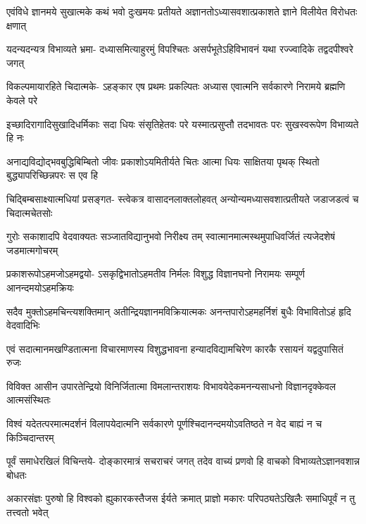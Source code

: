 \fourlineindentedshloka
{एवंविधे ज्ञानमये सुखात्मके}
{कथं भवो दुःखमयः प्रतीयते}
{अज्ञानतोऽध्यासवशात्प्रकाशते}
{ज्ञाने विलीयेत विरोधतः क्षणात्} %

\fourlineindentedshloka
{यदन्यदन्यत्र विभाव्यते भ्रमा-}
{दध्यासमित्याहुरमुं विपश्चितः}
{असर्पभूतेऽहिविभावनं यथा}
{रज्ज्वादिके तद्वदपीश्वरे जगत्} %

\fourlineindentedshloka
{विकल्पमायारहिते चिदात्मके-}
{ऽहङ्कार एष प्रथमः प्रकल्पितः}
{अध्यास एवात्मनि सर्वकारणे}
{निरामये ब्रह्मणि केवले परे} %

\fourlineindentedshloka
{इच्छादिरागादिसुखादिधर्मिकाः}
{सदा धियः संसृतिहेतवः परे}
{यस्मात्प्रसुप्तौ तदभावतः परः}
{सुखस्वरूपेण विभाव्यते हि नः} %

\fourlineindentedshloka
{अनाद्यविद्योद्भवबुद्धिबिम्बितो}
{जीवः प्रकाशोऽयमितीर्यते चितः}
{आत्मा धियः साक्षितया पृथक् स्थितो}
{बुद्ध्यापरिच्छिन्नपरः स एव हि} %

\fourlineindentedshloka
{चिद्बिम्बसाक्ष्यात्मधियां प्रसङ्गत-}
{स्त्वेकत्र वासादनलाक्तलोहवत्}
{अन्योन्यमध्यासवशात्प्रतीयते}
{जडाजडत्वं च चिदात्मचेतसोः} %

\fourlineindentedshloka
{गुरोः सकाशादपि वेदवाक्यतः}
{सञ्जातविद्यानुभवो निरीक्ष्य तम्}
{स्वात्मानमात्मस्थमुपाधिवर्जितं}
{त्यजेदशेषं जडमात्मगोचरम्} %

\fourlineindentedshloka
{प्रकाशरूपोऽहमजोऽहमद्वयो-}
{ऽसकृद्विभातोऽहमतीव निर्मलः}
{विशुद्ध विज्ञानघनो निरामयः}
{सम्पूर्ण आनन्दमयोऽहमक्रियः} %

\fourlineindentedshloka
{सदैव मुक्तोऽहमचिन्त्यशक्तिमान्}
{अतीन्द्रियज्ञानमविक्रियात्मकः}
{अनन्तपारोऽहमहर्निशं बुधैः}
{विभावितोऽहं हृदि वेदवादिभिः} %

\fourlineindentedshloka
{एवं सदात्मानमखण्डितात्मना}
{विचारमाणस्य विशुद्धभावना}
{हन्यादविद्यामचिरेण कारकै}
{रसायनं यद्वदुपासितं रुजः} %

\fourlineindentedshloka
{विविक्त आसीन उपारतेन्द्रियो}
{विनिर्जितात्मा विमलान्तराशयः}
{विभावयेदेकमनन्यसाधनो}
{विज्ञानदृक्केवल आत्मसंस्थितः} %

\fourlineindentedshloka
{विश्वं यदेतत्परमात्मदर्शनं}
{विलापयेदात्मनि सर्वकारणे}
{पूर्णश्चिदानन्दमयोऽवतिष्ठते}
{न वेद बाह्यं न च किञ्चिदान्तरम्} %

\fourlineindentedshloka
{पूर्वं समाधेरखिलं विचिन्तये-}
{दोङ्कारमात्रं सचराचरं जगत्}
{तदेव वाच्यं प्रणवो हि वाचको}
{विभाव्यतेऽज्ञानवशान्न बोधतः} %

\fourlineindentedshloka
{अकारसंज्ञः पुरुषो हि विश्वको}
{ह्युकारकस्तैजस ईर्यते क्रमात्}
{प्राज्ञो मकारः परिपठ्यतेऽखिलैः}
{समाधिपूर्वं न तु तत्त्वतो भवेत्} %

